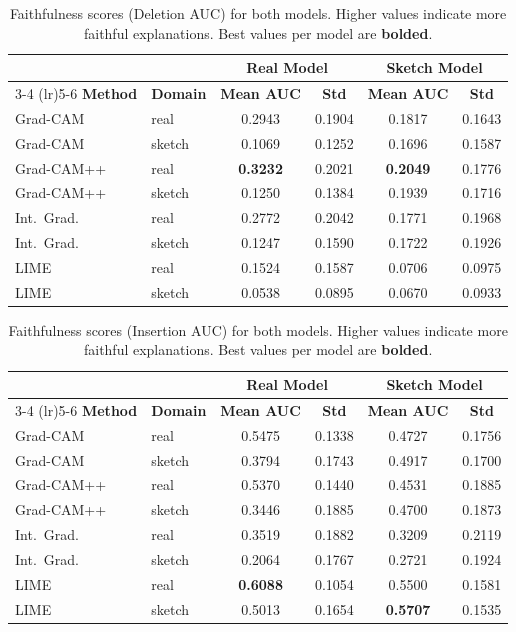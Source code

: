 \documentclass[12pt, a4paper]{article}
\begin{document}
\begin{table}[H]
\centering
\caption{Faithfulness scores (Deletion AUC) for both models.  Higher values
indicate more faithful explanations.  Best values per model are \textbf{bolded}.}
\label{tab:deletion}
\begin{tabular}{llcccc}
\toprule
& & \multicolumn{2}{c}{\textbf{Real Model}} & \multicolumn{2}{c}{\textbf{Sketch Model}} \\
\cmidrule(lr){3-4} \cmidrule(lr){5-6}
\textbf{Method} & \textbf{Domain} & \textbf{Mean AUC} & \textbf{Std}
& \textbf{Mean AUC} & \textbf{Std} \\
\midrule
Grad-CAM   & real   & 0.2943 & 0.1904 & 0.1817 & 0.1643 \\
Grad-CAM   & sketch & 0.1069 & 0.1252 & 0.1696 & 0.1587 \\
Grad-CAM++ & real   & \textbf{0.3232} & 0.2021 & \textbf{0.2049} & 0.1776 \\
Grad-CAM++ & sketch & 0.1250 & 0.1384 & 0.1939 & 0.1716 \\
Int.~Grad. & real   & 0.2772 & 0.2042 & 0.1771 & 0.1968 \\
Int.~Grad. & sketch & 0.1247 & 0.1590 & 0.1722 & 0.1926 \\
LIME       & real   & 0.1524 & 0.1587 & 0.0706 & 0.0975 \\
LIME       & sketch & 0.0538 & 0.0895 & 0.0670 & 0.0933 \\
\bottomrule
\end{tabular}
\end{table}

\begin{table}[H]
\centering
\caption{Faithfulness scores (Insertion AUC) for both models.  Higher values
indicate more faithful explanations.  Best values per model are \textbf{bolded}.}
\label{tab:insertion}
\begin{tabular}{llcccc}
\toprule
& & \multicolumn{2}{c}{\textbf{Real Model}} & \multicolumn{2}{c}{\textbf{Sketch Model}} \\
\cmidrule(lr){3-4} \cmidrule(lr){5-6}
\textbf{Method} & \textbf{Domain} & \textbf{Mean AUC} & \textbf{Std}
& \textbf{Mean AUC} & \textbf{Std} \\
\midrule
Grad-CAM   & real   & 0.5475 & 0.1338 & 0.4727 & 0.1756 \\
Grad-CAM   & sketch & 0.3794 & 0.1743 & 0.4917 & 0.1700 \\
Grad-CAM++ & real   & 0.5370 & 0.1440 & 0.4531 & 0.1885 \\
Grad-CAM++ & sketch & 0.3446 & 0.1885 & 0.4700 & 0.1873 \\
Int.~Grad. & real   & 0.3519 & 0.1882 & 0.3209 & 0.2119 \\
Int.~Grad. & sketch & 0.2064 & 0.1767 & 0.2721 & 0.1924 \\
LIME       & real   & \textbf{0.6088} & 0.1054 & 0.5500 & 0.1581 \\
LIME       & sketch & 0.5013 & 0.1654 & \textbf{0.5707} & 0.1535 \\
\bottomrule
\end{tabular}
\end{table}
\end{document}
